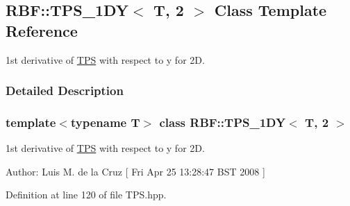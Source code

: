 \hypertarget{classRBF_1_1TPS__1DY_3_01T_00_012_01_4}{
\subsection{RBF::TPS\_\-1DY$<$ T, 2 $>$ Class Template Reference}
\label{classRBF_1_1TPS__1DY_3_01T_00_012_01_4}
}
1st derivative of \hyperlink{classRBF_1_1TPS}{TPS} with respect to y for 2D.  




\subsubsection{Detailed Description}
\subsubsection*{template$<$typename T$>$ class RBF::TPS\_\-1DY$<$ T, 2 $>$}

1st derivative of \hyperlink{classRBF_1_1TPS}{TPS} with respect to y for 2D. 

\begin{Desc}
\item[Author:]Luis M. de la Cruz \mbox{[} Fri Apr 25 13:28:47 BST 2008 \mbox{]} \end{Desc}


Definition at line 120 of file TPS.hpp.